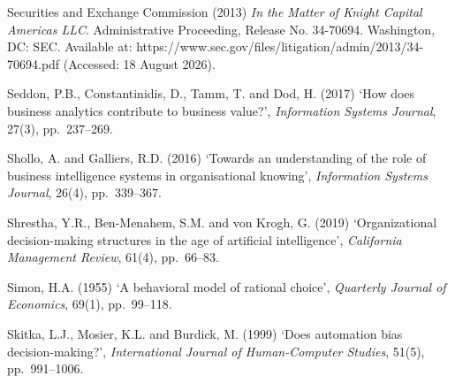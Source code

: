 \documentclass[11pt,a4paper]{article}
\numberwithin{figure}{section}
\numberwithin{table}{section}
\begin{document}
{\noindent\hypertarget{ref61}{}\begin{minipage}[t]{\dimexpr\linewidth-1.05cm\relax}Securities and Exchange Commission (2013) \emph{In the Matter of Knight Capital Americas LLC}. Administrative Proceeding, Release No. 34-70694. Washington, DC: SEC. Available at: https://www.sec.gov/files/litigation/admin/2013/34-70694.pdf (Accessed: 18 August 2026).\end{minipage}\par\vspace{4pt}
\noindent\hypertarget{ref62}{}\begin{minipage}[t]{\dimexpr\linewidth-1.05cm\relax}Seddon, P.B., Constantinidis, D., Tamm, T. and Dod, H. (2017) `How does business analytics contribute to business value?', \emph{Information Systems Journal}, 27(3), pp.~237--269.\end{minipage}\par\vspace{4pt}
\noindent\hypertarget{ref63}{}\begin{minipage}[t]{\dimexpr\linewidth-1.05cm\relax}Shollo, A. and Galliers, R.D. (2016) `Towards an understanding of the role of business intelligence systems in organisational knowing', \emph{Information Systems Journal}, 26(4), pp.~339--367.\end{minipage}\par\vspace{4pt}
\noindent\hypertarget{ref64}{}\begin{minipage}[t]{\dimexpr\linewidth-1.05cm\relax}Shrestha, Y.R., Ben-Menahem, S.M. and von Krogh, G. (2019) `Organizational decision-making structures in the age of artificial intelligence', \emph{California Management Review}, 61(4), pp.~66--83.\end{minipage}\par\vspace{4pt}
\noindent\hypertarget{ref65}{}\begin{minipage}[t]{\dimexpr\linewidth-1.05cm\relax}Simon, H.A. (1955) `A behavioral model of rational choice', \emph{Quarterly Journal of Economics}, 69(1), pp.~99--118.\end{minipage}\par\vspace{4pt}
\noindent\hypertarget{ref66}{}\begin{minipage}[t]{\dimexpr\linewidth-1.05cm\relax}Skitka, L.J., Mosier, K.L. and Burdick, M. (1999) `Does automation bias decision-making?', \emph{International Journal of Human-Computer Studies}, 51(5), pp.~991--1006.\end{minipage}\par\vspace{4pt}
}
\end{document}
